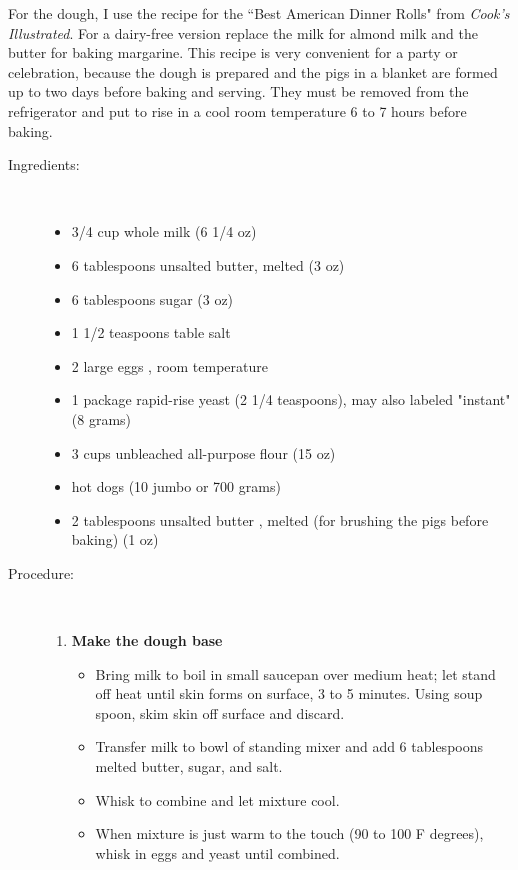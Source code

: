 \documentclass[11pt,letterpaper]{article}
\begin{document}


For the dough, I use the recipe for the ``Best American Dinner Rolls" from {\it Cook's Illustrated}. For a dairy-free version replace the milk for almond milk and the butter for baking margarine. This recipe is very convenient for a party or celebration, because the dough is prepared and the pigs in a blanket are formed up to two days before baking and serving. They must be removed from the refrigerator and put to rise in a cool room temperature 6 to 7 hours before baking.

\vspace{0.3in}
\begin{description}

\item[Ingredients:]\ \\
	\begin{itemize}
	\item 3/4 cup whole milk (6 1/4 oz)
	\item 6 tablespoons unsalted butter, melted (3 oz) 
	\item 6 tablespoons sugar (3 oz)
	\item 1 1/2 teaspoons table salt
	\item 2 large eggs , room temperature
	\item 1 package rapid-rise yeast (2 1/4 teaspoons), may also labeled "instant" (8 grams)
	\item 3 cups unbleached all-purpose flour (15 oz)
	\item hot dogs (10 jumbo or 700 grams)
	\item 2 tablespoons unsalted butter , melted (for brushing the pigs before baking) (1 oz)
	\end{itemize}

\item[Procedure:]\ \\
	\begin{enumerate}
	\item {\bf Make the dough base}
		\begin{itemize}
		\item Bring milk to boil in small saucepan over medium heat; let stand off heat until skin forms on surface,
3 to 5 minutes. Using soup spoon, skim skin off surface and discard. 
		\item Transfer milk to bowl of standing mixer and add 6
tablespoons melted butter, sugar, and salt. 
		\item Whisk to combine and let mixture cool. 
		\item When mixture is just warm to the touch (90 to 100 F degrees), whisk in eggs and yeast until combined.
		\end{itemize}


\end{enumerate}
\end{description}
\end{document}

